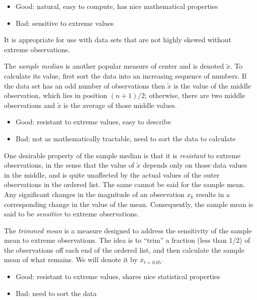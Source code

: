 \documentclass[captions=tableheading]{scrbook}
\begin{document}
\begin{itemize}
\item Good: natural, easy to compute, has nice mathematical properties
\item Bad: sensitive to extreme values
\end{itemize}

It is appropriate for use with data sets that are not highly skewed without extreme observations.

The \emph{sample median} is another popular measure of center and is denoted \(\tilde{x}\). To calculate its value, first sort the data into an increasing sequence of numbers. If the data set has an odd number of observations then \(\tilde{x}\) is the value of the middle observation, which lies in position \((n+1)/2\); otherwise, there are two middle observations and \(\tilde{x}\) is the average of those middle values.

\begin{itemize}
\item Good: resistant to extreme values, easy to describe
\item Bad: not as mathematically tractable, need to sort the data to calculate
\end{itemize}

One desirable property of the sample median is that it is \emph{resistant} to extreme observations, in the sense that the value of \(\tilde{x}\) depends only on those data values in the middle, and is quite unaffected by the actual values of the outer observations in the ordered list. The same cannot be said for the sample mean. Any significant changes in the magnitude of an observation \(x_{k}\) results in a corresponding change in the value of the mean. Consequently, the sample mean is said to be \emph{sensitive} to extreme observations.

The \emph{trimmed mean} is a measure designed to address the sensitivity of the sample mean to extreme observations. The idea is to ``trim'' a fraction (less than 1/2) of the observations off each end of the ordered list, and then calculate the sample mean of what remains. We will denote it by \(\overline{x}_{t=0.05}\).

\begin{itemize}
\item Good: resistant to extreme values, shares nice statistical properties
\item Bad: need to sort the data
\end{itemize}
\end{document}
